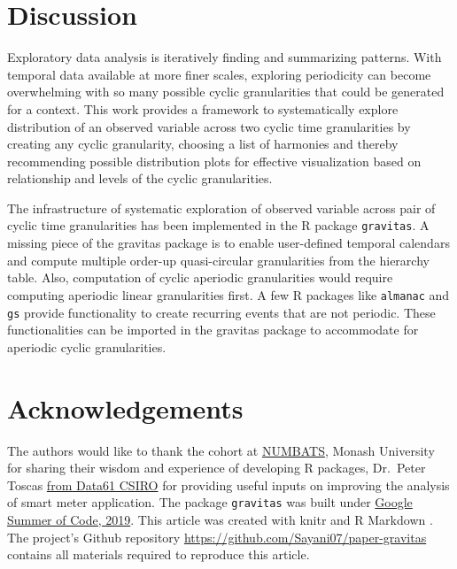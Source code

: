 \documentclass[12pt]{article}
\begin{document}
\hypertarget{sec:discussion}{%
\section{Discussion}\label{sec:discussion}}

Exploratory data analysis is iteratively finding and summarizing patterns. With temporal data available at more finer scales, exploring periodicity can become overwhelming with so many possible cyclic granularities that could be generated for a context. This work provides a framework to systematically explore distribution of an observed variable across two cyclic time granularities by creating any cyclic granularity, choosing a list of harmonies and thereby recommending possible distribution plots for effective visualization based on relationship and levels of the cyclic granularities.

The infrastructure of systematic exploration of observed variable across pair of cyclic time granularities has been implemented in the
R package \texttt{gravitas}. A missing piece of the gravitas package is to enable user-defined temporal calendars and compute multiple order-up quasi-circular granularities from the hierarchy table. Also, computation of cyclic aperiodic granularities would require computing aperiodic linear granularities first. A few R packages like \texttt{almanac} and \texttt{gs} provide functionality to create recurring events that are not periodic. These functionalities can be imported in the gravitas package to accommodate for aperiodic cyclic granularities.

\hypertarget{acknowledgements}{%
\section*{Acknowledgements}\label{acknowledgements}}

The authors would like to thank the cohort at \href{https://www.monash.edu/news/articles/team-profile-monash-business-analytics-team}{NUMBATS}, Monash University for sharing their wisdom and experience of developing R packages, Dr.~Peter Toscas \href{https://data61.csiro.au/}{from Data61 CSIRO} for providing useful inputs on improving the analysis of smart meter application. The package \texttt{gravitas} was built under \href{https://summerofcode.withgoogle.com/archive/}{Google Summer of Code, 2019}. This article was created with knitr \citep{knitr} and R Markdown \citep{rmarkdown}. The project's Github repository \url{https://github.com/Sayani07/paper-gravitas} contains all materials required to reproduce this article.



\end{document}
